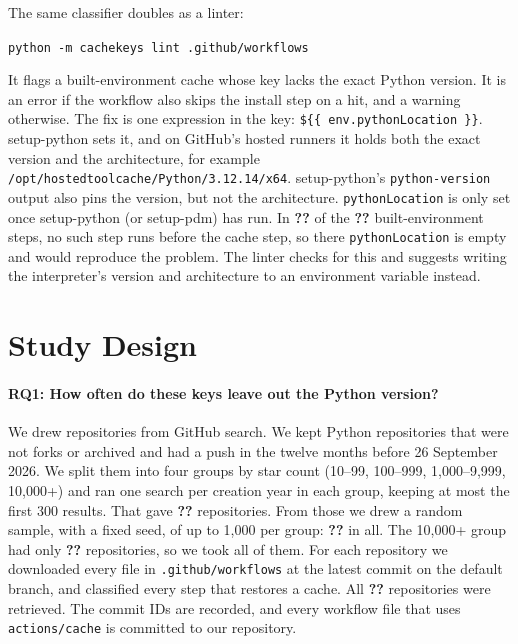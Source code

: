 \documentclass[10pt,a4paper]{article}
\newcommand{\ck}[1]{\textbf{??}}\newcommand{\repourl}{\url{https://github.com/mark124/cache-key-soundness}}%
\begin{document}
The same classifier doubles as a linter:
\begin{center}
\texttt{python -m cachekeys lint .github/workflows}
\end{center}
It flags a built-environment cache whose key lacks the exact Python version.
It is an error if the workflow also skips the install step on a hit, and a
warning otherwise. The fix is one expression in the key:
\texttt{\$\{\{ env.pythonLocation \}\}}. setup-python sets it, and on GitHub's
hosted runners it holds both the exact version and the architecture, for
example \texttt{/opt/hostedtoolcache/Python/3.12.14/x64}. setup-python's
\texttt{python-version} output also pins the version, but not the
architecture. \texttt{pythonLocation} is only set once setup-python (or
setup-pdm) has run. In \ck{h.built_without_setup_python} of the
\ck{h.built_env_steps} built-environment steps, no such step runs before the
cache step, so there \texttt{pythonLocation} is empty and would reproduce the
problem. The linter checks for this and suggests writing the interpreter's
version and architecture to an environment variable instead.

\section{Study Design}

\paragraph{RQ1: How often do these keys leave out the Python version?}
We drew repositories from GitHub search. We kept Python repositories that
were not forks or archived and had a push in the twelve months before
26 September 2026. We split them into four groups by star count (10--99,
100--999, 1,000--9,999, 10,000+) and ran one search per creation year in each
group, keeping at most the first 300 results. That gave \ck{h.frame_size}
repositories. From those we drew a random sample, with a fixed seed, of up to
1,000 per group: \ck{h.repos_sampled} in all. The 10,000+ group had only
\ck{h.frame_s4} repositories, so we took all of them. For each repository we
downloaded every file in \texttt{.github/workflows} at the latest commit on
the default branch, and classified every step that restores a cache. All
\ck{h.repos_retrieved} repositories were retrieved. The commit IDs are
recorded, and every workflow file that uses
\texttt{actions/cache} is committed to our repository.
\end{document}
